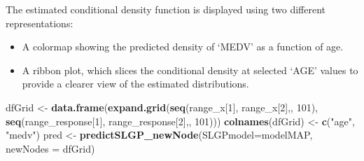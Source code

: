 \documentclass[
]{article}
\newenvironment{Shaded}{\begin{snugshade}}{\end{snugshade}}
\newcommand{\AttributeTok}[1]{\textcolor[rgb]{0.13,0.29,0.53}{#1}}
\newcommand{\DecValTok}[1]{\textcolor[rgb]{0.00,0.00,0.81}{#1}}
\newcommand{\FunctionTok}[1]{\textcolor[rgb]{0.13,0.29,0.53}{\textbf{#1}}}
\newcommand{\NormalTok}[1]{#1}
\newcommand{\OtherTok}[1]{\textcolor[rgb]{0.56,0.35,0.01}{#1}}
\newcommand{\StringTok}[1]{\textcolor[rgb]{0.31,0.60,0.02}{#1}}
\begin{document}
The estimated conditional density function is displayed using two different representations:

\begin{itemize}
\item
  A colormap showing the predicted density of `MEDV' as a function of age.
\item
  A ribbon plot, which slices the conditional density at selected `AGE' values to provide a clearer view of the estimated distributions.
\end{itemize}

\begin{Shaded}
\begin{Highlighting}[]
\NormalTok{dfGrid }\OtherTok{\textless{}{-}} \FunctionTok{data.frame}\NormalTok{(}\FunctionTok{expand.grid}\NormalTok{(}\FunctionTok{seq}\NormalTok{(range\_x[}\DecValTok{1}\NormalTok{], range\_x[}\DecValTok{2}\NormalTok{],, }\DecValTok{101}\NormalTok{), }
                                 \FunctionTok{seq}\NormalTok{(range\_response[}\DecValTok{1}\NormalTok{], range\_response[}\DecValTok{2}\NormalTok{],, }\DecValTok{101}\NormalTok{)))}
\FunctionTok{colnames}\NormalTok{(dfGrid) }\OtherTok{\textless{}{-}} \FunctionTok{c}\NormalTok{(}\StringTok{"age"}\NormalTok{, }\StringTok{"medv"}\NormalTok{)}
\NormalTok{pred }\OtherTok{\textless{}{-}} \FunctionTok{predictSLGP\_newNode}\NormalTok{(}\AttributeTok{SLGPmodel=}\NormalTok{modelMAP,}
                            \AttributeTok{newNodes =}\NormalTok{ dfGrid)}


\end{Highlighting}
\end{Shaded}
\end{document}
